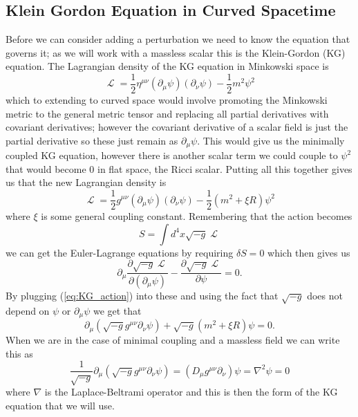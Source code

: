 \documentclass[12pt]{article}
\numberwithin{equation}{section}
\DeclareMathOperator{\Lagr}{\mathcal{L}}
\numberwithin{figure}{section}
\begin{document}
\subsection{Klein Gordon Equation in Curved Spacetime} %
\label{sub:klein_gordon_equation_in_curved_spacetime}
Before we can consider adding a perturbation we need to know the equation that governs it; as we will work with a massless scalar this is the Klein-Gordon (KG) equation. The Lagrangian density of the KG equation in Minkowski space is 
\begin{equation}
	\Lagr =\frac{1}{2}\eta^{\mu\nu}(\partial_{\mu}\psi)(\partial_{\nu}\psi) -\frac{1}{2}m^{2}\psi^{2}
\end{equation}
which to extending to curved space would involve promoting the Minkowski metric to the general metric tensor and replacing all partial derivatives with covariant derivatives; however the covariant derivative of a scalar field is just the partial derivative so these just remain as $\partial_{\mu}\psi$. This would give us the minimally coupled KG equation, however there is another scalar term we could couple to $\psi^{2}$ that would become 0 in flat space, the Ricci scalar. Putting all this together gives us that the new Lagrangian density is
\begin{equation}
	\Lagr =\frac{1}{2}g^{\mu\nu}(\partial_{\mu}\psi)(\partial_{\nu}\psi) -\frac{1}{2}(m^{2}+\xi R)\psi^{2} \label{eq:KG_action}
\end{equation}
where $\xi$ is some general coupling constant. Remembering that the action becomes
\begin{equation}
	S=\int d^{4}x \sqrt{-g}\Lagr
\end{equation}
we can get the Euler-Lagrange equations by requiring $\delta S=0$ which then gives us
\begin{equation}
	\partial_{\mu}\frac{\partial\sqrt{-g}\Lagr}{\partial(\partial_{\mu}\psi)}-\frac{\partial\sqrt{-g}\Lagr}{\partial\psi}=0.
\end{equation}
By plugging (\ref{eq:KG_action}) into these and using the fact that $\sqrt{-g}$ does not depend on $\psi$ or $\partial_{\mu}\psi$ we get that
\begin{equation}
	\partial_{\mu}(\sqrt{-g}g^{\mu\nu}\partial_{\nu}\psi)+\sqrt{-g}(m^{2}+\xi R)\psi=0.
\end{equation}
When we are in the case of minimal coupling and a massless field we can write this as
\begin{equation}
	\frac{1}{\sqrt{-g}}\partial_{\mu}(\sqrt{-g}g^{\mu\nu}\partial_{\nu}\psi)=(D_{\mu}g^{\mu\nu}\partial_{\nu})\psi=\nabla^{2}\psi=0 \label{KG_equation_curved}
\end{equation}
where $\nabla$ is the Laplace-Beltrami operator and this is then the form of the KG equation that we will use.
\end{document}

